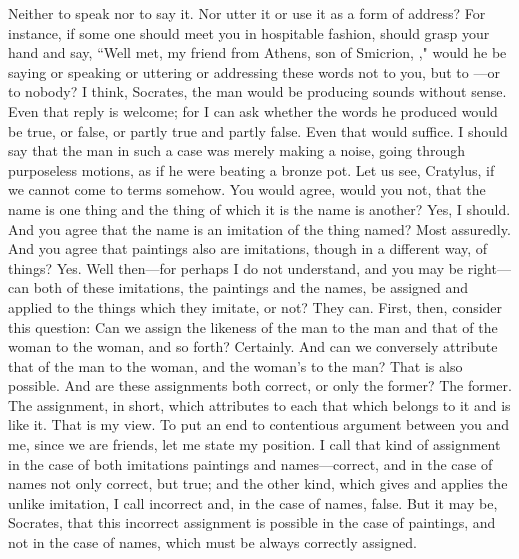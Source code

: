 {{{{{Neither to speak nor to say it.
\socratesspeaks
Nor utter it or use it as a form of address? For instance, if some one should meet you in hospitable fashion, should grasp your hand and say, ``Well met, my friend from Athens, son of Smicrion, \hermogenesspeaks," would he be saying or speaking or uttering or addressing these words not to you, but to \hermogenesspeaks—or to nobody?
\cratylusspeaks
I think, Socrates, the man would be producing sounds without sense.
\socratesspeaks
Even that reply is welcome;  for I can ask whether the words he produced would be true, or false, or partly true and partly false. Even that would suffice.
\cratylusspeaks
I should say that the man in such a case was merely making a noise, going through purposeless motions, as if he were beating a bronze pot.
\socratesspeaks
Let us see, Cratylus, if we cannot come to terms somehow. You would agree, would you not, that the name is one thing and the thing of which it is the name is another?
\cratylusspeaks
Yes, I should.
\socratesspeaks
And you agree that the name is an imitation  of the thing named?
\cratylusspeaks
Most assuredly.
\socratesspeaks
And you agree that paintings also are imitations, though in a different way, of things?
\cratylusspeaks
Yes.
\socratesspeaks
Well then—for perhaps I do not understand, and you may be right—can both of these imitations, the paintings and the names, be assigned and applied to the things which they imitate, or not? 
\cratylusspeaks
They can.
\socratesspeaks
First, then, consider this question: Can we assign the likeness of the man to the man and that of the woman to the woman, and so forth?
\cratylusspeaks
Certainly.
\socratesspeaks
And can we conversely attribute that of the man to the woman, and the woman's to the man?
\cratylusspeaks
That is also possible.
\socratesspeaks
And are these assignments both correct, or only the former?
\cratylusspeaks
The former.
\socratesspeaks
The assignment, in short, which attributes to each that which belongs to it and is like it.
\cratylusspeaks
That is my view.
\socratesspeaks
To put an end to contentious argument between you and me,  since we are friends, let me state my position. I call that kind of assignment in the case of both imitations paintings and names—correct, and in the case of names not only correct, but true; and the other kind, which gives and applies the unlike imitation, I call incorrect and, in the case of names, false.
\cratylusspeaks
But it may be, Socrates, that this incorrect assignment is possible in the case of paintings, and not in the case of names,  which must be always correctly assigned.
}}}}}
